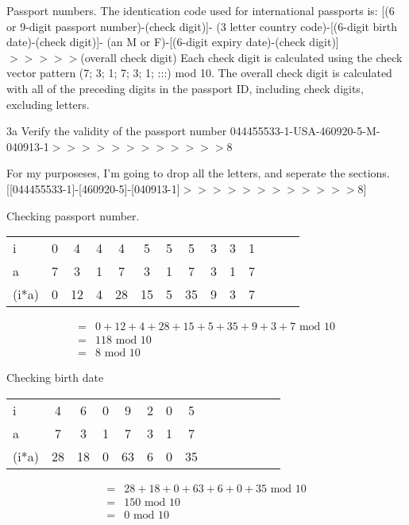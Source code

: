 \begin{question}{3}
Passport numbers. The identication code used for international passports is:
[(6 or 9-digit passport number)-(check digit)]-
(3 letter country code)-[(6-digit birth date)-(check digit)]-
(an M or F)-[(6-digit expiry date)-(check digit)]$>>>>>$(overall check digit)
Each check digit is calculated using the check vector pattern (7; 3; 1; 7; 3; 1; :::) mod 10.
The overall check digit is calculated with all of the preceding digits in the passport ID,
including check digits, excluding letters.
\end{question}


\begin{question}{3a}
Verify the validity of the passport number
044455533-1-USA-460920-5-M-040913-1$>>>>>>>>>>>>$8

For my purposeses, I'm going to drop all the letters, and seperate the sections.
[[044455533-1]-[460920-5]-[040913-1]$>>>>>>>>>>>>$8]

Checking passport number.

\begin{tabular}{l|ccccccccccccc}
\hline
i     & 0  & 4  & 4  & 4  & 5  & 5  & 5  & 3  & 3  & 1 \\
a     & 7  & 3  & 1  & 7  & 3  & 1  & 7  & 3  & 1  & 7 \\
\hline
(i*a) & 0  & 12 & 4  & 28 & 15 & 5  & 35 & 9  & 3  & 7
\end{tabular}

\begin{align*}
=& 0  + 12 + 4  + 28 + 15 + 5  + 35 + 9  + 3  + 7 \textrm{ mod } 10\\
=& 118 \textrm{ mod } 10\\
=& 8 \textrm{ mod } 10
\end{align*}



Checking birth date

\begin{tabular}{l|ccccccccccccc}
\hline
i     & 4  & 6  & 0  & 9  & 2  & 0  & 5 \\
a     & 7  & 3  & 1  & 7  & 3  & 1  & 7 \\
\hline
(i*a) & 28 & 18 & 0  & 63 & 6  & 0  & 35
\end{tabular}

\begin{align*}
=& 28 + 18 + 0  + 63 + 6  + 0  + 35 \textrm{ mod } 10\\
=& 150 \textrm{ mod } 10\\
=& 0 \textrm{ mod } 10
\end{align*}


\end{question}
